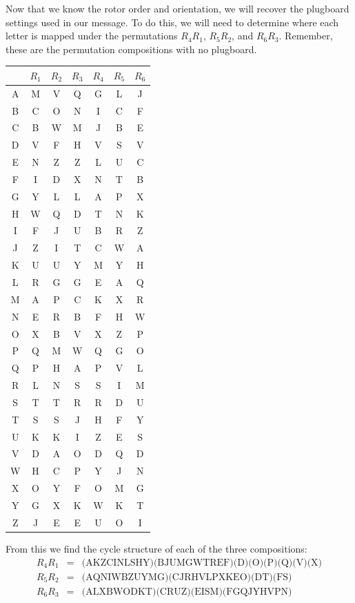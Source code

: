 \documentclass{book}
\theoremstyle{plain}
\theoremstyle{definition}
\begin{document}
Now that we know the rotor order and orientation, we will recover the plugboard settings used in our message. To do this, we will need to determine where each letter is mapped under the permutations $R_4R_1$, $R_5R_2$, and $R_6R_3$. Remember, these are the permutation compositions with no plugboard.

\begin{center}
\begin{tabular}{c|cccccc}
& $R_1$ & $R_2$ & $R_3$ & $R_4$ & $R_5$ & $R_6$ \\
\hline
A & M & V & Q & G & L & J \\
B & C & O & N & I & C & F \\
C & B & W & M & J & B & E \\
D & V & F & H & V & S & V \\
E & N & Z & Z & L & U & C \\
F & I & D & X & N & T & B \\
G & Y & L & L & A & P & X \\
H & W & Q & D & T & N & K \\
I & F & J & U & B & R & Z \\
J & Z & I & T & C & W & A \\
K & U & U & Y & M & Y & H \\
L & R & G & G & E & A & Q \\
M & A & P & C & K & X & R \\
N & E & R & B & F & H & W \\
O & X & B & V & X & Z & P \\
P & Q & M & W & Q & G & O \\
Q & P & H & A & P & V & L \\
R & L & N & S & S & I & M \\
S & T & T & R & R & D & U \\
T & S & S & J & H & F & Y \\
U & K & K & I & Z & E & S \\
V & D & A & O & D & Q & D \\
W & H & C & P & Y & J & N \\
X & O & Y & F & O & M & G \\
Y & G & X & K & W & K & T \\
Z & J & E & E & U & O & I \\
\end{tabular}
\end{center}

From this we find the cycle structure of each of the three compositions:
\begin{eqnarray*}
R_4R_1 &=& \text{(AKZCINLSHY)(BJUMGWTREF)(D)(O)(P)(Q)(V)(X)} \\
R_5R_2 &=& \text{(AQNIWBZUYMG)(CJRHVLPXKEO)(DT)(FS)} \\
R_6R_3 &=& \text{(ALXBWODKT)(CRUZ)(EISM)(FGQJYHVPN)}
\end{eqnarray*}
\end{document}
